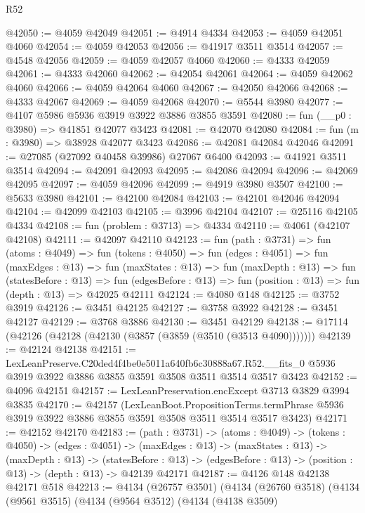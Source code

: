 \begin{lexlean}{R52}
\begin{coremodule}
@42050 := @4059 @42049
@42051 := @4914 @4334
@42053 := @4059 @42051 @4060
@42054 := @4059 @42053
@42056 := @41917 @3511 @3514
@42057 := @4548 @42056
@42059 := @4059 @42057 @4060
@42060 := @4333 @42059
@42061 := @4333 @42060
@42062 := @42054 @42061
@42064 := @4059 @42062 @4060
@42066 := @4059 @42064 @4060
@42067 := @42050 @42066
@42068 := @4333 @42067
@42069 := @4059 @42068
@42070 := @5544 @3980
@42077 := @4107 @5986 @5936 @3919 @3922 @3886 @3855 @3591
@42080 := fun (__p0 : @3980) => @41851 @42077 @3423
@42081 := @42070 @42080
@42084 := fun (m : @3980) => @38928 @42077 @3423
@42086 := @42081 @42084 @42046
@42091 := @27085 (@27092 @40458 @39986) @27067 @6400
@42093 := @41921 @3511 @3514
@42094 := @42091 @42093
@42095 := @42086 @42094
@42096 := @42069 @42095
@42097 := @4059 @42096
@42099 := @4919 @3980 @3507
@42100 := @5633 @3980
@42101 := @42100 @42084
@42103 := @42101 @42046 @42094
@42104 := @42099 @42103
@42105 := @3996 @42104
@42107 := @25116 @42105 @4334
@42108 := fun (problem : @3713) => @4334
@42110 := @4061 (@42107 @42108)
@42111 := @42097 @42110
@42123 := fun (path : @3731) =>
  fun (atoms : @4049) =>
  fun (tokens : @4050) =>
  fun (edges : @4051) =>
  fun (maxEdges : @13) =>
  fun (maxStates : @13) =>
  fun (maxDepth : @13) =>
  fun (statesBefore : @13) =>
  fun (edgesBefore : @13) => fun (position : @13) => fun (depth : @13) => @42025 @42111
@42124 := @4080 @148
@42125 := @3752 @3919
@42126 := @3451 @42125
@42127 := @3758 @3922
@42128 := @3451 @42127
@42129 := @3768 @3886
@42130 := @3451 @42129
@42138 := @17114 (@42126 (@42128 (@42130 (@3857 (@3859 (@3510 (@3513 @4090)))))))
@42139 := @42124 @42138
@42151 := LexLeanPreserve.C20ded4f4be0e5011a640fb6c30888a67.R52.__fits_0
    @5936
    @3919
    @3922
    @3886
    @3855
    @3591
    @3508
    @3511
    @3514
    @3517
    @3423
@42152 := @4096 @42151
@42157 := LexLeanPreservation.encExcept @3713 @3829 @3994 @3835
@42170 := @42157
    (LexLeanBoot.PropositionTerms.termPhrase
      @5936
      @3919
      @3922
      @3886
      @3855
      @3591
      @3508
      @3511
      @3514
      @3517
      @3423)
@42171 := @42152 @42170
@42183 := (path : @3731) ->
  (atoms : @4049) ->
  (tokens : @4050) ->
  (edges : @4051) ->
  (maxEdges : @13) ->
  (maxStates : @13) ->
  (maxDepth : @13) ->
  (statesBefore : @13) -> (edgesBefore : @13) -> (position : @13) -> (depth : @13) -> @42139 @42171
@42187 := @4126 @148 @42138 @42171 @518
@42213 := @4134
    (@26757 @3501)
    (@4134
      (@26760 @3518)
      (@4134
        (@9561 @3515)
        (@4134
          (@9564 @3512)
          (@4134
            (@4138 @3509)

\end{coremodule}
\end{lexlean}
